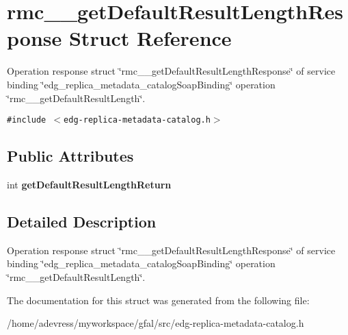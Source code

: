 \section{rmc\_\-\_\-get\-Default\-Result\-Length\-Response Struct Reference}
\label{structrmc____getDefaultResultLengthResponse}
Operation response struct \char`\"{}rmc\_\-\_\-get\-Default\-Result\-Length\-Response\char`\"{} of service binding \char`\"{}edg\_\-replica\_\-metadata\_\-catalog\-Soap\-Binding\char`\"{} operation \char`\"{}rmc\_\-\_\-get\-Default\-Result\-Length\char`\"{}.  


{\tt \#include $<$edg-replica-metadata-catalog.h$>$}

\subsection*{Public Attributes}
\begin{CompactItemize}
\item 
int \textbf{get\-Default\-Result\-Length\-Return}\label{structrmc____getDefaultResultLengthResponse_5d71fd662c818763cb2b8f398f8e8ee7}

\end{CompactItemize}


\subsection{Detailed Description}
Operation response struct \char`\"{}rmc\_\-\_\-get\-Default\-Result\-Length\-Response\char`\"{} of service binding \char`\"{}edg\_\-replica\_\-metadata\_\-catalog\-Soap\-Binding\char`\"{} operation \char`\"{}rmc\_\-\_\-get\-Default\-Result\-Length\char`\"{}. 



The documentation for this struct was generated from the following file:\begin{CompactItemize}
\item 
/home/adevress/myworkspace/gfal/src/edg-replica-metadata-catalog.h\end{CompactItemize}
